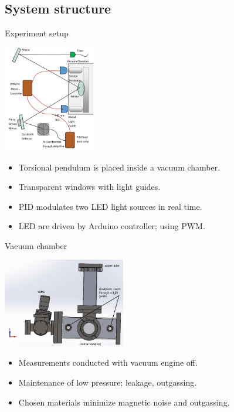 \documentclass{beamer}
\begin{document}
\subsection{System structure}
\begin{frame}{Experiment setup}
	\begin{center}		
			\includegraphics[width=0.3\textwidth,keepaspectratio]{setup cropped.png}
	\end{center}
	\begin{itemize}

		\item Torsional pendulum is placed inside a vacuum chamber. 
		\item Transparent windows with light guides.
		\item PID modulates two LED light sources in real time.
		\item LED are driven by Arduino controller; using PWM.
	
	\end{itemize}
	
\end{frame}

\begin{frame}{Vacuum chamber}
	\begin{center}		
		\includegraphics[width=0.4\textwidth,keepaspectratio]{chamber_front_names.PNG}
	\end{center}
	\begin{itemize}

		\item Measurements conducted with vacuum engine off.
		\item Maintenance of low pressure; leakage, outgassing.
		\item Chosen materials minimize magnetic noise and outgassing.

		
	\end{itemize}	
\end{frame}
\end{document}
